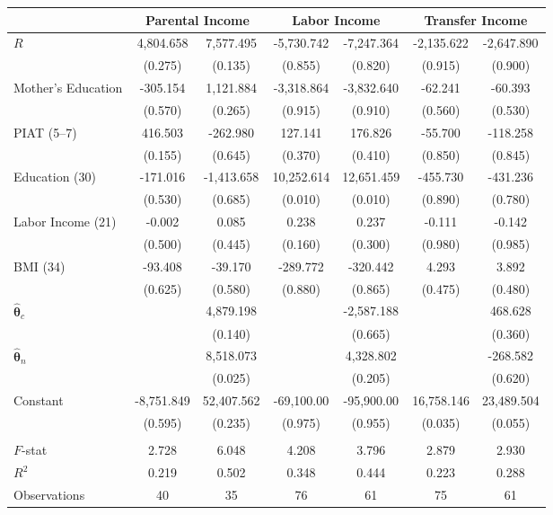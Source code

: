 \begin{tabular}{lcccccc}
\toprule
& \multicolumn{2}{c}{Parental Income} & \multicolumn{2}{c}{Labor Income} & \multicolumn{2}{c}{Transfer Income}\\
\midrule
$R$ & 4,804.658 & 7,577.495 & -5,730.742 & -7,247.364 & -2,135.622 & -2,647.890 \\
& (0.275) & (0.135) & (0.855) & (0.820) & (0.915) & (0.900) \\
Mother's Education & -305.154 & 1,121.884 & -3,318.864 & -3,832.640 & -62.241 & -60.393 \\
& (0.570) & (0.265) & (0.915) & (0.910) & (0.560) & (0.530) \\
PIAT (5--7) & 416.503 & -262.980 & 127.141 & 176.826 & -55.700 & -118.258 \\
& (0.155) & (0.645) & (0.370) & (0.410) & (0.850) & (0.845) \\
Education (30) & -171.016 & -1,413.658 & 10,252.614 & 12,651.459 & -455.730 & -431.236 \\
& (0.530) & (0.685) & (0.010) & (0.010) & (0.890) & (0.780) \\
Labor Income (21) & -0.002 & 0.085 & 0.238 & 0.237 & -0.111 & -0.142 \\
& (0.500) & (0.445) & (0.160) & (0.300) & (0.980) & (0.985) \\
BMI (34) & -93.408 & -39.170 & -289.772 & -320.442 & 4.293 & 3.892 \\
& (0.625) & (0.580) & (0.880) & (0.865) & (0.475) & (0.480) \\
$\hat{\bm{\theta}}_c$ &   & 4,879.198 &   & -2,587.188 &   & 468.628 \\
&  &  (0.140) &   & (0.665) &   & (0.360) \\
$\hat{\bm{\theta}}_n$ &   & 8,518.073 &   & 4,328.802 &   & -268.582 \\
&   & (0.025) &   & (0.205) &   & (0.620) \\
Constant & -8,751.849 & 52,407.562 & -69,100.00 & -95,900.00 & 16,758.146 & 23,489.504 \\
& (0.595) & (0.235) & (0.975) & (0.955) & (0.035) & (0.055) \\ \\
\midrule
$F$-stat & 2.728 & 6.048 & 4.208 & 3.796 & 2.879 & 2.930 \\
$R^2$ & 0.219 & 0.502 & 0.348 & 0.444 & 0.223 & 0.288 \\
Observations & 40 & 35 & 76 & 61 & 75 & 61 \\
\bottomrule
\end{tabular}